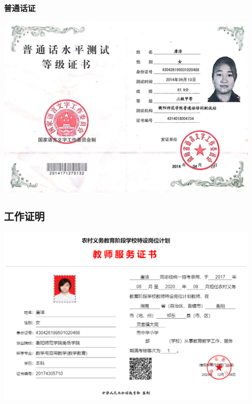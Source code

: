 \documentclass[UFT8]{ctexart}%
\begin{document}
\subsubsection{普通话证}
\includegraphics[scale=0.25]{figs/普通话证.jpg }


\subsection{工作证明}
\begin{center}
 \includegraphics[scale=0.2]{figs/特岗服务证书.jpg }
\end{center}
%
\end{document}
